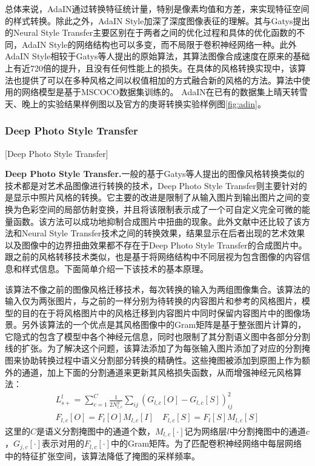 总体来说，AdaIN通过转换特征统计量，特别是像素均值和方差，来实现特征空间的样式转换。除此之外，AdaIN Style加深了深度图像表征的理解。其与Gatys提出的Neural Style Transfer主要区别在于两者之间的优化过程和具体的优化函数的不同，AdaIN Style的网络结构也可以多变，而不局限于卷积神经网络一种。此外AdaIN Style相较于Gatys等人提出的原始算法，其算法图像合成速度在原来的基础上有近720倍的提升\cite{adin-github}，且没有任何性能上的损失。在具体的风格转换实现中，该算法也提供了可以在多种风格之间以权值相加的方式融合新的风格的方法。算法中使用的网络模型是基于MSCOCO\cite{mscoco}数据集训练的。
AdaIN在已有的数据集上晴天转雪天、晚上的实验结果样例图以及官方的庚哥转换实验样例图\ref{fig:adin}。


\subsubsection{Deep Photo Style Transfer}[Deep Photo Style Transfer]

\textbf{Deep Photo Style Transfer.}\cite{dpst}\quad  一般的基于Gatys等人提出的图像风格转换类似的技术都是对艺术品图像进行转换的技术，Deep Photo Style Transfer则主要针对的是显示中照片风格的转换。它主要的改进是限制了从输入图片到输出图片之间的变换为色彩空间的局部仿射变换，并且将该限制表示成了一个可自定义完全可微的能量函数。该方法可以成功地抑制合成图片中扭曲的现象。此外文献\cite{dpst}中还比较了该方法和Neural Style Transfer技术之间的转换效果，结果显示在后者出现的艺术效果以及图像中的边界扭曲效果都不存在于Deep Photo Style Transfer的合成图片中。跟之前的风格转移技术类似，也是基于将网络结构中不同层视为包含图像的内容信息和样式信息。下面简单介绍一下该技术的基本原理。

该算法不像之前的图像风格迁移技术，每次转换的输入为两组图像集合。该算法的输入仅为两张图片，与之前的一样分别为待转换的内容图片和参考的风格图片，模型的目的在于将风格图片中的风格迁移到内容图片中同时保留内容图片中的图像场景。另外该算法的一个优点是其风格图像中的Gram矩阵是基于整张图片计算的，它隐式的包含了模型中各个神经元信息，同时也限制了其分割语义图中各部分分割线的扩张。为了解决这个问题，该算法添加了为每张输入图片添加了对应的分割掩图来协助转换过程中语义分割部分转换的精确性。这些掩图被添加到原图上作为额外的通道，加上下面的分割通道来更新其风格损失函数，从而增强神经元风格算法：
\begin{equation}
    \begin{aligned}
    L_{s+}^l=\sum_{c=1}^C \frac{1}{2N_{l,c}^2}\sum_{ij}(G_{l,c}[O]-G_{l,c}[S])_{ij}^2\\
    F_{l,c}[O]=F_l[O]M_{l,c}[I]\quad F_{l,c}[S]=F_l[S]M_{l,c}[S] 
    \end{aligned}
\end{equation}
这里的$C$是语义分割掩图中的通道个数，$M_{l,c}[\cdot]$记为网络层$l$中分割掩图中的通道$c$，$G_{j,c}[\cdot]$表示对用的$F_{l,c}[\cdot]$中的Gram矩阵。为了匹配卷积神经网络中每层网络中的特征扩张空间，该算法降低了掩图的采样频率。

